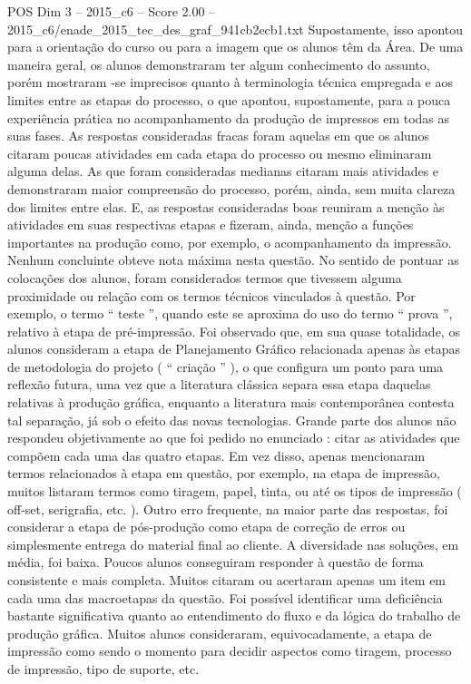 \begin{textsample}{POS Dim 3 – 2015\_c6 – Score 2.00 – 2015\_c6/enade\_2015\_tec\_des\_graf\_941cb2ecb1.txt}
Supostamente, isso apontou para a orientação do curso ou para a imagem que os alunos têm da Área.
De uma maneira geral, os alunos demonstraram ter algum conhecimento do assunto, porém mostraram -se imprecisos quanto à terminologia técnica empregada e aos limites entre as etapas do processo, o que apontou, supostamente, para a pouca experiência prática no acompanhamento da produção de impressos em todas as suas fases.
As respostas consideradas fracas foram aquelas em que os alunos citaram poucas atividades em cada etapa do processo ou mesmo eliminaram alguma delas.
As que foram consideradas medianas citaram mais atividades e demonstraram maior compreensão do processo, porém, ainda, sem muita clareza dos limites entre elas.
E, as respostas consideradas boas reuniram a menção às atividades em suas respectivas etapas e fizeram, ainda, menção a funções importantes na produção como, por exemplo, o acompanhamento da impressão.
Nenhum concluinte obteve nota máxima nesta questão.
No sentido de pontuar as colocações dos alunos, foram considerados termos que tivessem alguma proximidade ou relação com os termos técnicos vinculados à questão.
Por exemplo, o termo “ teste ”, quando este se aproxima do uso do termo “ prova ”, relativo à etapa de pré-impressão.
Foi observado que, em sua quase totalidade, os alunos consideram a etapa de Planejamento Gráfico relacionada apenas às etapas de metodologia do projeto ( “ criação ” ), o que configura um ponto para uma reflexão futura, uma vez que a literatura clássica separa essa etapa daquelas relativas à produção gráfica, enquanto a literatura mais contemporânea contesta tal separação, já sob o efeito das novas tecnologias.
Grande parte dos alunos não respondeu objetivamente ao que foi pedido no enunciado : citar as atividades que compõem cada uma das quatro etapas.
Em vez disso, apenas mencionaram termos relacionados à etapa em questão, por exemplo, na etapa de impressão, muitos listaram termos como tiragem, papel, tinta, ou até os tipos de impressão ( off-set, serigrafia, etc. ).
Outro erro frequente, na maior parte das respostas, foi considerar a etapa de pós-produção como etapa de correção de erros ou simplesmente entrega do material final ao cliente.
A diversidade nas soluções, em média, foi baixa.
Poucos alunos conseguiram responder à questão de forma consistente e mais completa.
Muitos citaram ou acertaram apenas um item em cada uma das macroetapas da questão.
Foi possível identificar uma deficiência bastante significativa quanto ao entendimento do fluxo e da lógica do trabalho de produção gráfica.
Muitos alunos consideraram, equivocadamente, a etapa de impressão como sendo o momento para decidir aspectos como tiragem, processo de impressão, tipo de suporte, etc.

\end{textsample}
